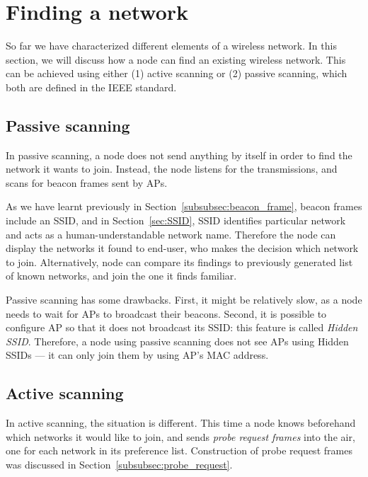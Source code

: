 \documentclass[12pt,a4paper,oneside,pdftex]{report}
\begin{document}
\section{Finding a network}
\label{sec:joining}

So far we have characterized different elements of a wireless network. In this section, we will discuss how a node can find an existing wireless network. This can be achieved using either (1) active scanning or (2) passive scanning, which both are defined in the IEEE standard.~\cite{IEEE802.11_scanning}

\subsection{Passive scanning}
\label{subsec:passive_scanning}

In passive scanning, a node does not send anything by itself in order to find the network it wants to join. Instead, the node listens for the transmissions, and scans for beacon frames sent by APs.

As we have learnt previously in Section~\ref{subsubsec:beacon_frame}, beacon frames include an SSID, and in Section~\ref{sec:SSID}, SSID identifies particular network and acts as a human-understandable network name. Therefore the node can display the networks it found to end-user, who makes the decision which network to join. Alternatively, node can compare its findings to previously generated list of known networks, and join the one it finds familiar.

Passive scanning has some drawbacks. First, it might be relatively slow, as a node needs to wait for APs to broadcast their beacons. Second, it is possible to configure AP so that it does not broadcast its SSID: this feature is called \emph{Hidden SSID}. Therefore, a node using passive scanning does not see APs using Hidden SSIDs --- it can only join them by using AP's MAC address.

\subsection{Active scanning}
\label{subsec:active_scanning}

In active scanning, the situation is different. This time a node knows beforehand which networks it would like to join, and sends \emph{probe request frames} into the air, one for each network in its preference list. Construction of probe request frames was discussed in Section~\ref{subsubsec:probe_request}.
\end{document}
